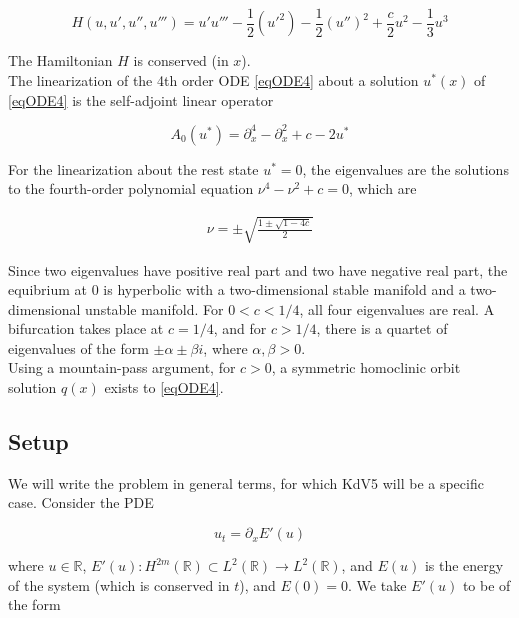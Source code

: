 \documentclass[12pt]{article}
\def\R{{\mathbb R}}
\begin{document}
\begin{equation}\label{Hamiltonian}
H(u, u', u'', u''') = u'u''' - \frac{1}{2}(u'^2) - \frac{1}{2}(u'')^2 + \frac{c}{2}u^2 - \frac{1}{3}u^3 
\end{equation}

The Hamiltonian $H$ is conserved (in $x$).\\

The linearization of the 4th order ODE \eqref{eqODE4} about a solution $u^*(x)$ of \eqref{eqODE4} is the self-adjoint linear operator

\begin{equation}\label{defA0}
A_0(u^*) = \partial_x^4 - \partial_x^2 + c - 2 u^* 
\end{equation}

For the linearization about the rest state $u^* = 0$, the eigenvalues are the solutions to the fourth-order polynomial equation $\nu^4 - \nu^2 + c = 0$, which are

\begin{align}\label{specA0}
\nu = \pm \sqrt{ \frac{1 \pm \sqrt{1 - 4c} }{2}}
\end{align}

Since two eigenvalues have positive real part and two have negative real part, the equibrium at 0 is hyperbolic with a two-dimensional stable manifold and a two-dimensional unstable manifold. For $0 < c < 1/4$, all four eigenvalues are real. A bifurcation takes place at $c = 1/4$, and for $c > 1/4$, there is a quartet of eigenvalues of the form $\pm \alpha \pm \beta i$, where $\alpha, \beta > 0$.\\

Using a mountain-pass argument, for $c > 0$, a symmetric homoclinic orbit solution $q(x)$ exists to \eqref{eqODE4}.

\subsection{Setup}

We will write the problem in general terms, for which KdV5 will be a specific case. Consider the PDE

\begin{equation}\label{genPDE}
u_t = \partial_x E'(u)
\end{equation}

where $u \in \R$, $E'(u): H^{2m}(\R) \subset L^2(\R) \rightarrow L^2(\R)$, and $E(u)$ is the energy of the system (which is conserved in $t$), and $E(0) = 0$. We take $E'(u)$ to be of the form
\end{document}
